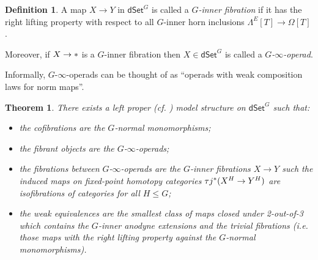 \documentclass[a4paper,10pt
,draft
]{article}%
\numberwithin{equation}{section}
\numberwithin{figure}{section}
\newtheorem{theorem}[equation]{Theorem}%
\theoremstyle{definition} %
\newtheorem{definition}[equation]{Definition}%
\newtheorem{example}[equation]{Example}%
\newcommand{\dSet}{\mathsf{dSet}}
\DeclareMathOperator{\Hom}{Hom}%
\newcommand{\1}{\ensuremath{\mathbbm 1}}%
\begin{document}
\begin{definition}
	A map $X \to Y$ in $\dSet^G$
	is called a \emph{$G$-inner fibration}
	if it has the right lifting property
	with respect to all $G$-inner horn inclusions
	$\Lambda^E[T] \to \Omega[T]$.
	
	Moreover, 
	if $X \to \**$
	is a $G$-inner fibration
	then 
	$X \in \dSet^G$ is called a \textit{$G$-$\infty$-operad}.
\end{definition}


Informally,
$G$-$\infty$-operads can be thought of as
``operads with weak composition laws for norm maps''.







\begin{theorem}\label{DSETGMOD THM}
	{\cite[Thm 2.1]{Per18}}
There exists a left proper (cf. \cite[Prop. 8.8]{Per18}) model structure on $\dSet^G$ such that:
\begin{itemize}
	\item the cofibrations are the $G$-normal monomorphisms;
	\item the fibrant objects are the $G$-$\infty$-operads;
	\item the fibrations between
	$G$-$\infty$-operads 
	are the $G$-inner fibrations $X \to Y$
	such the induced maps on 
	fixed-point homotopy categories $\tau j^{\**}(X^H \to Y^H)$ are isofibrations of categories for all $H \leq G$;
	\item the weak equivalences are the smallest class of maps closed under 2-out-of-3 which
	contains the $G$-inner anodyne extensions and the trivial fibrations
	(i.e. those maps with the right lifting property against the $G$-normal monomorphisms).
\end{itemize}
\end{theorem}
\end{document}
